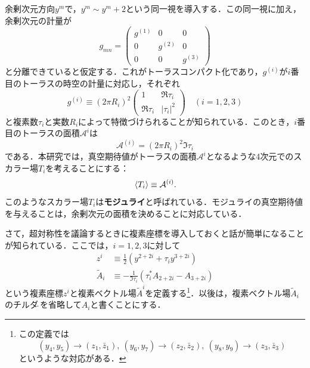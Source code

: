 \documentclass[a4paper,uplatex,dvipdfmx]{jsarticle}
\theoremstyle{definition}
\begin{document}
余剰次元方向$y^{m}$で，$y^{m}\sim y^{m}+2$という同一視を導入する．この同一視に加え，余剰次元の計量が
\begin{equation}
   g_{mn}
   =
   \begin{pmatrix}
      g^{(1)} & 0 & 0 \\
      0 & g^{(2)} & 0 \\
      0 & 0 & g^{(3)} 
   \end{pmatrix}
   \nonumber
\end{equation}
と分離できていると仮定する．これがトーラスコンパクト化であり，$g^{(i)}$が$i$番目のトーラスの時空の計量に対応し，それぞれ
\begin{equation}
   g^{(i)}
   \equiv
   (2\pi R_{i})^2
   \begin{pmatrix}
      1 & \Re\tau_{i} \\
      \Re\tau_{i} & |\tau_{i}|^2
   \end{pmatrix}
   \quad
   (i=1,2,3)
   \nonumber
\end{equation}
と複素数$\tau_{i}$と実数$R_{i}$によって特徴づけられることが知られている．このとき，$i$番目のトーラスの面積$\mathcal{A}^{i}$は
\begin{equation}
   \mathcal{A}^{(i)}
   =
   (2\pi R_{i})^2\Im\tau_{i}
   \label{are_torus}
\end{equation}
である．本研究では，真空期待値がトーラスの面積$\mathcal{A}^{i}$となるような4次元でのスカラー場$T_{i}$を考えることにする：
\begin{equation}
   \ev*{T_{i}}
   \equiv
   \mathcal{A}^{(i)}
   .
   \label{def_moduli}
\end{equation}
このようなスカラー場$T_{i}$は\textbf{モジュライ}と呼ばれている．モジュライの真空期待値を与えることは，余剰次元の面積を決めることに対応している．

さて，超対称性を議論するときに複素座標を導入しておくと話が簡単になることが知られている．ここでは，$i=1,2,3$に対して
\begin{align}
   z^{i}
   &\equiv
   \frac{1}{2}(y^{2+2i}+\tau_{i}y^{3+2i})
   \nonumber
   \\
   \tilde{A}_{i}
   &\equiv
   -
   \frac{1}{\Im\tau_{i}}(\tau_{i}^{*}A_{2+2i}-A_{3+2i})
   \nonumber
\end{align}
という複素座標$z^{i}$と複素ベクトル場$\tilde{A}^{i}$を定義する\footnote{
   この定義では
   $$
      (y_{4},y_{5})
      \rightarrow
      (z_{1},\bar{z}_{1})
      ,\ 
      (y_{6},y_{7})
      \rightarrow
      (z_{2},\bar{z}_{2})
      ,\ 
      (y_{8},y_{9})
      \rightarrow
      (z_{3},\bar{z}_{3})
   $$
   というような対応がある．
}．以後は，複素ベクトル場$\tilde{A}_{i}$のチルダ$\tilde{\ }$を省略して$A_{i}$と書くことにする．
\end{document}
